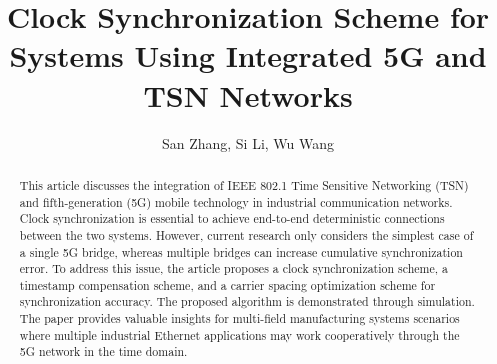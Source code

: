 \documentclass[english]{cccconf}
\begin{document}
\title{Clock Synchronization Scheme for Systems Using Integrated 5G and TSN Networks}
	

\author{San Zhang,
	Si Li,
	Wu Wang}




\maketitle
\begin{abstract}
This article discusses the integration of IEEE 802.1 Time Sensitive Networking (TSN) and fifth-generation (5G) mobile technology in industrial communication networks. Clock synchronization is essential to achieve end-to-end deterministic connections between the two systems. However, current research only considers the simplest case of a single 5G bridge, whereas multiple bridges can increase cumulative synchronization error. To address this issue, the article proposes a clock synchronization scheme, a timestamp compensation scheme, and a carrier spacing optimization scheme for synchronization accuracy. The proposed algorithm is demonstrated through simulation. The paper provides valuable insights for multi-field manufacturing systems scenarios where multiple industrial Ethernet applications may work cooperatively through the 5G network in the time domain.
\end{abstract}

\end{document}
